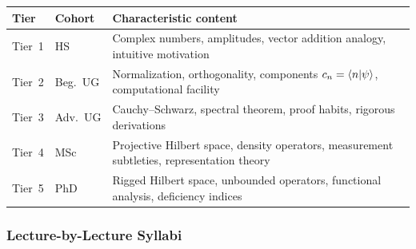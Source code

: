 \documentclass[11pt,a4paper]{article}
\begin{document}
\begin{center}
\begin{tabular}{llp{9cm}}
\toprule
\textbf{Tier} & \textbf{Cohort} & \textbf{Characteristic content}\\
\midrule
Tier~1 & HS       & Complex numbers, amplitudes, vector addition analogy,
                    intuitive motivation\\
Tier~2 & Beg.\ UG & Normalization, orthogonality, components $c_n=\braket{n|\psi}$,
                    computational facility\\
Tier~3 & Adv.\ UG & Cauchy--Schwarz, spectral theorem, proof habits, rigorous derivations\\
Tier~4 & MSc      & Projective Hilbert space, density operators, measurement subtleties,
                    representation theory\\
Tier~5 & PhD      & Rigged Hilbert space, unbounded operators, functional analysis,
                    deficiency indices\\
\bottomrule
\end{tabular}
\end{center}

\subsubsection*{Lecture-by-Lecture Syllabi}
\end{document}
